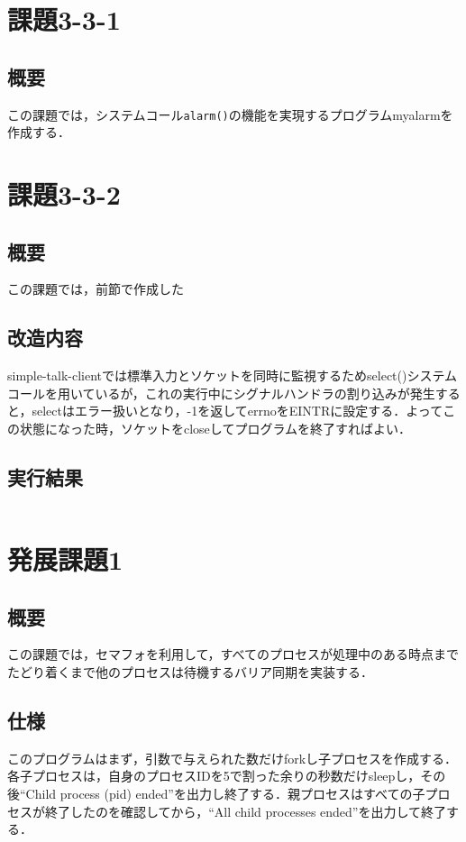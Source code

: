 \documentclass[a4j,10pt,titlepage]{jsarticle}
\begin{document}
\section{課題3-3-1}
\subsection{概要}
この課題では，システムコール\verb|alarm()|の機能を実現するプログラムmyalarmを作成する．

\section{課題3-3-2}
\subsection{概要}
この課題では，前節で作成した

\subsection{改造内容}
simple-talk-clientでは標準入力とソケットを同時に監視するためselect()システムコールを用いているが，これの実行中にシグナルハンドラの割り込みが発生すると，selectはエラー扱いとなり，-1を返してerrnoをEINTRに設定する．よってこの状態になった時，ソケットをcloseしてプログラムを終了すればよい．

\subsection{実行結果}
\begin{verbatim}

\end{verbatim}

\section{発展課題1}
\subsection{概要}
この課題では，セマフォを利用して，すべてのプロセスが処理中のある時点までたどり着くまで他のプロセスは待機するバリア同期を実装する．

\subsection{仕様}
このプログラムはまず，引数で与えられた数だけforkし子プロセスを作成する．各子プロセスは，自身のプロセスIDを5で割った余りの秒数だけsleepし，その後``Child process (pid) ended''を出力し終了する．親プロセスはすべての子プロセスが終了したのを確認してから，``All child processes ended''を出力して終了する．
\end{document}
